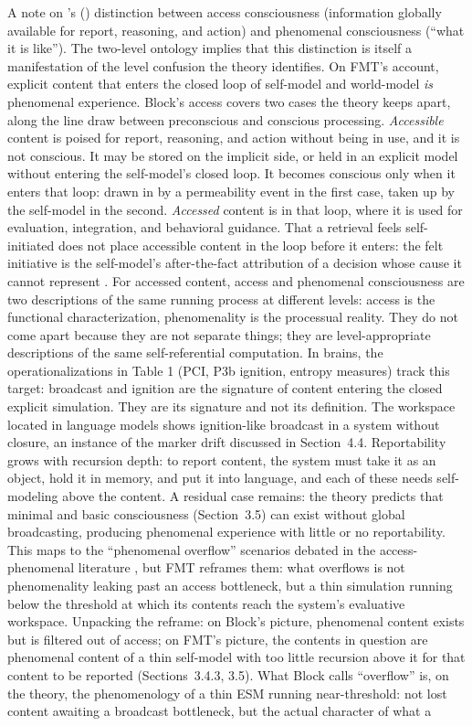 \documentclass[12pt]{article}
\newcommand{\rev}[1]{#1}
\begin{document}
A note on \rev{\citeauthor{Block1995}'s (\citeyear{Block1995})} distinction between access consciousness (information globally available for report, reasoning, and action) and phenomenal consciousness (``what it is like''). The two-level ontology implies that this distinction is itself a manifestation of the level confusion the theory identifies. On FMT's account, explicit content that enters the closed loop of self-model and world-model \emph{is} phenomenal experience. Block's access covers two cases the theory keeps apart, along the line \citet{Dehaene2006} draw between preconscious and conscious processing. \emph{Accessible} content is poised for report, reasoning, and action without being in use, and it is not conscious. It may be stored on the implicit side, or held in an explicit model without entering the self-model's closed loop. It becomes conscious only when it enters that loop: drawn in by a permeability event in the first case, taken up by the self-model in the second. \emph{Accessed} content is in that loop, where it is used for evaluation, integration, and behavioral guidance. That a retrieval feels self-initiated does not place accessible content in the loop before it enters: the felt initiative is the self-model's after-the-fact attribution of a decision whose cause it cannot represent \citep[][Section~4.2.2]{Libet1985,Wegner2002}. For accessed content, access and phenomenal consciousness are two descriptions of the same running process at different levels: access is the functional characterization, phenomenality is the processual reality. They do not come apart because they are not separate things; they are level-appropriate descriptions of the same self-referential computation. In brains, the operationalizations in Table 1 (PCI, P3b ignition, entropy measures) track this target: broadcast and ignition are the signature of content entering the closed explicit simulation. They are its signature and not its definition. The workspace \citet{Gurnee2026} located in language models shows ignition-like broadcast in a system without closure, an instance of the marker drift discussed in Section~4.4. Reportability grows with recursion depth: to report content, the system must take it as an object, hold it in memory, and put it into language, and each of these needs self-modeling above the content. A residual case remains: the theory predicts that minimal and basic consciousness (Section~3.5) can exist without global broadcasting, producing phenomenal experience with little or no reportability. This maps to the ``phenomenal overflow'' scenarios debated in the access-phenomenal literature \citep{Block2007}, but FMT reframes them: what overflows is not phenomenality leaking past an access bottleneck, but a thin simulation running below the threshold at which its contents reach the system's evaluative workspace. Unpacking the reframe: on Block's picture, phenomenal content exists but is filtered out of access; on FMT's picture, the contents in question are phenomenal content of a thin self-model with too little recursion above it for that content to be reported (Sections~3.4.3, 3.5). What Block calls ``overflow'' is, on the theory, the phenomenology of a thin ESM running near-threshold: not lost content awaiting a broadcast bottleneck, but the actual character of what a 
\end{document}
